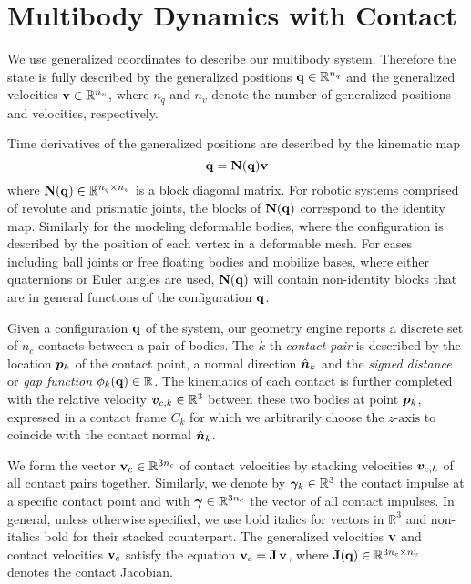 
\section{Multibody Dynamics with Contact}
\label{sec:multibody_dynamics_with_contact}

We use generalized coordinates to describe our multibody system. Therefore the
state is fully described by the generalized positions
${\mathbf{q}}\in\mathbb{R}^{n_q}$ and the generalized velocities
${\mathbf{v}}\in\mathbb{R}^{n_v}$, where $n_q$ and $n_v$ denote the number of
generalized positions and velocities, respectively.

Time derivatives of the generalized positions are described by the kinematic map
\begin{equation}
	\dot{\mf{q}} = \mf{N}(\mf{q})\mf{v}
	\label{eq:kinematic_map}
\end{equation}
where ${\mathbf{N}}({\mathbf{q}})\in\mathbb{R}^{n_q\times n_v}$ is a block diagonal matrix.
For robotic systems comprised of revolute and prismatic joints, the blocks of
${\mathbf{N}}({\mathbf{q}})$ correspond to the identity map. Similarly for the modeling
deformable bodies, where the configuration is described by the position of each
vertex in a deformable mesh. For cases including ball joints or free floating
bodies and mobilize bases, where either quaternions or Euler angles are used,
${\mathbf{N}}({\mathbf{q}})$ will contain non-identity blocks that are in general functions
of the configuration ${\mathbf{q}}$.

Given a configuration ${\mathbf{q}}$ of the system, our geometry engine reports a
discrete set of $n_c$ contacts between a pair of bodies. The $k\text{-th}$
\emph{contact pair} is described by the location ${\bm{p}}_k$ of the contact
point, a normal direction $\hat{{\bm{n}}}_k$ and the \emph{signed distance} or
\emph{gap function} $\phi_k({\mathbf{q}})\in\mathbb{R}$. The kinematics of each
contact is further completed with the relative velocity
${\bm{v}}_{c,k}\in\mathbb{R}^3$ between these two bodies at point ${\bm{p}}_k$,
expressed in a contact frame $C_k$ for which we arbitrarily choose the
$z\text{-axis}$ to coincide with the contact normal $\hat{{\bm{n}}}_k$.

We form the vector ${\mathbf{v}}_{c}\in\mathbb{R}^{3n_c}$ of contact velocities by
stacking velocities ${\bm{v}}_{c,k}$ of all contact pairs together. Similarly, we
denote by ${\bm\gamma}_k\in\mathbb{R}^3$ the contact impulse at a specific contact
point and with ${\bm\gamma}\in\mathbb{R}^{3n_c}$ the vector of all contact impulses.
In general, unless otherwise specified, we use bold italics for vectors in
$\mathbb{R}^3$ and non-italics bold for their stacked counterpart. The
generalized velocities ${\mathbf{v}}$ and contact velocities ${\mathbf{v}}_c$ satisfy the
equation ${\mathbf{v}}_c={\mathbf{J}}\,{\mathbf{v}}$, where
${\mathbf{J}}({\mathbf{q}})\in\mathbb{R}^{3n_c\times n_v}$ denotes the contact Jacobian.

